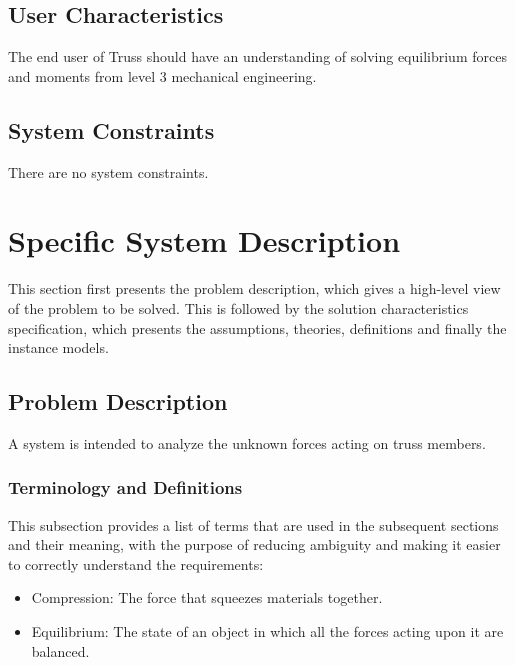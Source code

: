 \documentclass[12pt]{article}
\begin{document}
\subsection{User Characteristics} \label{SecUserCharacteristics}
The end user of Truss should have an understanding of solving equilibrium 
forces and moments from level 3 mechanical engineering.

\subsection{System Constraints}
There are no system constraints.

\section{Specific System Description}

This section first presents the problem description, which gives a high-level
view of the problem to be solved.  This is followed by the solution characteristics
specification, which presents the assumptions, theories, definitions and finally
the instance models.  

\subsection{Problem Description} \label{Sec_pd}

A system is intended to analyze the unknown forces acting on truss members.

\subsubsection{Terminology and  Definitions}

This subsection provides a list of terms that are used in the subsequent
sections and their meaning, with the purpose of reducing ambiguity and making it
easier to correctly understand the requirements:

\begin{itemize}
	
	\item Compression: The force that squeezes materials together.
	
\end{itemize}

\begin{itemize}
	
	\item Equilibrium: The state of an object in which all the forces acting 
	upon it are balanced. 
	
\end{itemize}
\end{document}
